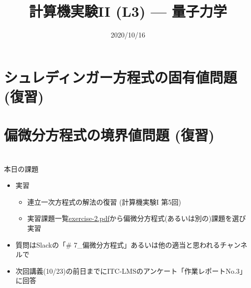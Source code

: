 \documentclass[10pt,dvipdfmx]{beamer}
\title{計算機実験II (L3) --- 量子力学}
\date{2020/10/16}
\begin{document}
\begin{frame}
  \titlepage
  \tableofcontents
\end{frame}



\section{シュレディンガー方程式の固有値問題 (復習)}








\section{偏微分方程式の境界値問題 (復習)}





\section{}
\begin{frame}[t]{本日の課題}
  \begin{itemize}
  \item 実習
    \begin{itemize}
    \item 連立一次方程式の解法の復習 (計算機実験I 第5回)
    \item 実習課題一覧\href{https://github.com/todo-group/ComputerExperiments/releases/tag/2020a-computer2}{exercise-2.pdf}から偏微分方程式(あるいは別の)課題を選び実習
    \end{itemize}
  \item 質問はSlackの「\# 7\_偏微分方程式」あるいは他の適当と思われるチャンネルで
  \item 次回講義(10/23)の前日までにITC-LMSのアンケート「作業レポートNo.3」に回答
  \end{itemize}
\end{frame}
\end{document}
